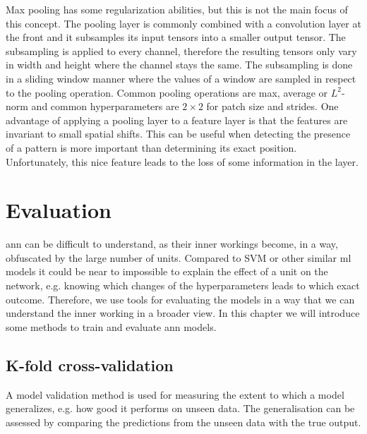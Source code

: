 Max pooling has some regularization abilities, but this is not the main focus of this concept.
The pooling layer is commonly combined with a convolution layer at the front and it subsamples its input tensors into a smaller output tensor. The subsampling is applied to every channel, therefore the resulting tensors only vary in width and height where the channel stays the same. The subsampling is done in a sliding window manner where the values of a window are sampled in respect to the pooling operation. Common pooling operations are max, average or $L^2$-norm and common hyperparameters are $2\times2$ for patch size and strides.
One advantage of applying a pooling layer to a feature layer is that the features are invariant to small spatial shifts. This can be useful when detecting the presence of a pattern is more important than determining its exact position. Unfortunately, this nice feature leads to the loss of some information in the layer.

\section{Evaluation}
\Gls{ann} can be difficult to understand, as their inner workings become, in a way, obfuscated by the large number of units. Compared to SVM or other similar \gls{ml} models it could be near to impossible to explain the effect of a unit on the network, e.g. knowing which changes of the hyperparameters leads to which exact outcome.
Therefore, we use tools for evaluating the models in a way that we can understand the inner working in a broader view. In this chapter we will introduce some methods to train and evaluate \gls{ann} models.

\subsection{K-fold cross-validation}

A model validation method is used for measuring the extent to which a model generalizes, e.g. how good it performs on unseen data.
The generalisation can be assessed by comparing the predictions from the unseen data with the true output.\\\\

